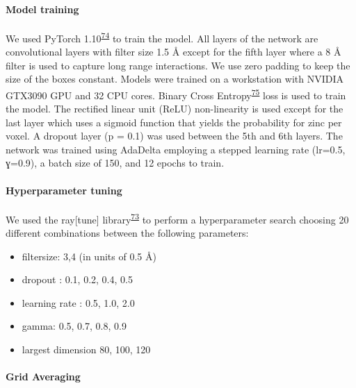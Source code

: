 \documentclass[  ASAPversion,
  ,
  9pt]{elife}
\providecommand{\tightlist}{%
  \setlength{\itemsep}{0pt}\setlength{\parskip}{0pt}}
\begin{document}
\hypertarget{model-training}{%
\paragraph{Model training}\label{model-training}}

We used PyTorch 1.10\textsuperscript{\protect\hyperlink{ref-iOWq2JB8}{74}} to train the model. All layers of the network are convolutional layers with filter size 1.5 Å except for the fifth layer where a 8 Å filter is used to capture long range interactions. We use zero padding to keep the size of the boxes constant. Models were trained on a workstation with NVIDIA GTX3090 GPU and 32 CPU cores. Binary Cross Entropy\textsuperscript{\protect\hyperlink{ref-hchMCnC1}{75}} loss is used to train the model. The rectified linear unit (ReLU) non-linearity is used except for the last layer which uses a sigmoid function that yields the probability for zinc per voxel. A dropout layer (p = 0.1) was used between the 5th and 6th layers. The network was trained using AdaDelta employing a stepped learning rate (lr=0.5, ɣ=0.9), a batch size of 150, and 12 epochs to train.

\hypertarget{hyperparameter-tuning}{%
\paragraph{Hyperparameter tuning}\label{hyperparameter-tuning}}

We used the ray{[}tune{]} library\textsuperscript{\protect\hyperlink{ref-19MS2ZVR1}{73}} to perform a hyperparameter search choosing 20 different combinations between the following parameters:

\begin{itemize}
\tightlist
\item
  filtersize: 3,4 (in units of 0.5 Å)
\item
  dropout : 0.1, 0.2, 0.4, 0.5
\item
  learning rate : 0.5, 1.0, 2.0
\item
  gamma: 0.5, 0.7, 0.8, 0.9
\item
  largest dimension 80, 100, 120
\end{itemize}

\hypertarget{grid-averaging}{%
\paragraph{Grid Averaging}\label{grid-averaging}}
\end{document}
